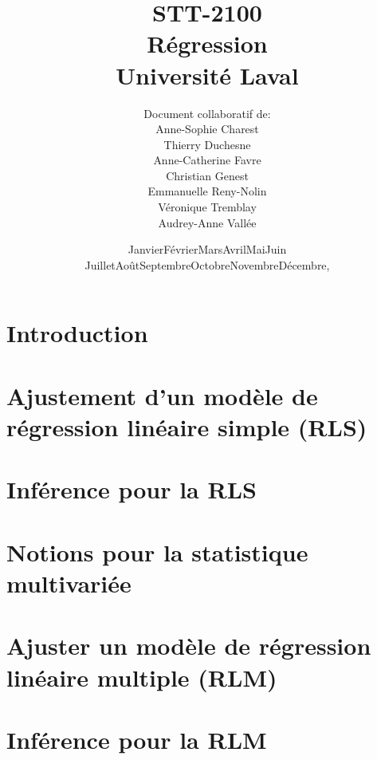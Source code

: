 \documentclass[11pt]{book}
\title{STT-2100 \\ Régression \\ Université Laval \\[3cm]}
\author{Document collaboratif de: \\
Anne-Sophie Charest \\
Thierry Duchesne \\
Anne-Catherine Favre \\
Christian Genest \\
Emmanuelle Reny-Nolin \\
Véronique Tremblay \\
Audrey-Anne Vallée \\[3cm]}
\date{\ifcase\month\or
  Janvier\or Février\or Mars\or Avril\or Mai\or Juin\or
  Juillet\or Août\or Septembre\or Octobre\or Novembre\or Décembre\fi, \the\year}
\begin{document}
\maketitle

\dominitoc \tableofcontents
\dominilof \listoffigures

\chapter{Introduction} \label{sec:intro}
\minitoc \mtcskip \minilof


\chapter{Ajustement d'un modèle de régression linéaire simple (RLS)} \label{sec:AjusterRLS}
\minitoc \mtcskip \minilof


\chapter{Inférence pour la RLS} \label{sec:InferenceRLS}
\minitoc \mtcskip \minilof


\chapter{Notions pour la statistique multivariée} \label{sec:NotionsMultivarie}
\minitoc \mtcskip \minilof


\chapter{Ajuster un modèle de régression linéaire multiple (RLM)} \label{sec:AjusterRLM}
\minitoc \mtcskip \minilof


\chapter{Inférence pour la RLM} 
\label{sec:InferenceRLM}
\minitoc \mtcskip \minilof












\end{document}
